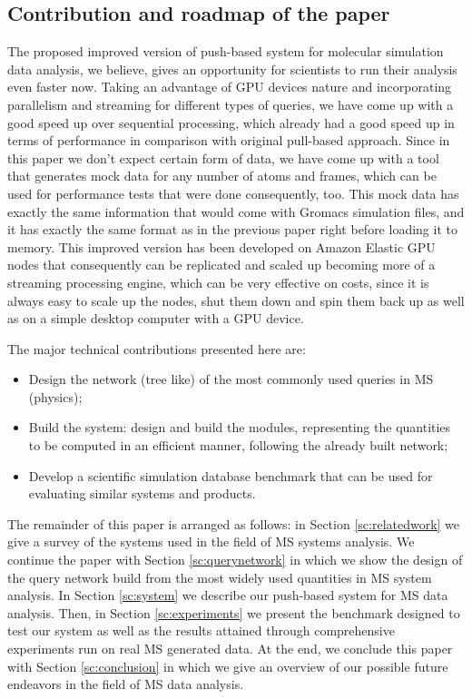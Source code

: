 \documentclass[10pt,journal,final,letterpaper,twocolumn]{IEEEtran}
\begin{document}
\subsection{Contribution and roadmap of the paper} 
The proposed improved version of push-based system for molecular simulation data analysis, we believe, gives an opportunity for scientists to run their analysis even faster now. Taking an advantage of GPU devices nature and incorporating parallelism and streaming for different types of queries, we have come up with a good speed up over sequential processing, which already had a good speed up in terms of performance in comparison with original pull-based approach. Since in this paper we don't expect certain form of data, we have come up with a tool that generates mock data for any number of atoms and frames, which can be used for performance tests that were done consequently, too. This mock data has exactly the same information that would come with Gromacs simulation files, and it has exactly the same format as in the previous paper \cite{mainPaper} right before loading it to memory. This improved version has been developed on Amazon Elastic GPU nodes that consequently can be replicated and scaled up becoming more of a streaming processing engine, which can be very effective on costs, since it is always easy to scale up the nodes, shut them down and spin them back up as well as on a simple desktop computer with a GPU device.

The major technical contributions presented here are:
\begin{itemize}
\item Design the network (tree like) of the most commonly used queries in MS (physics);
\item Build the system: design and build the modules, representing the quantities to be
computed in an efficient manner, following the already built
network;
\item Develop a scientific simulation database benchmark that can be used for evaluating similar systems and products.
\end{itemize}

The remainder of this paper is arranged as follows: in Section
\ref{sc:relatedwork} we give a survey of the systems used in the
field of MS systems analysis. We continue the paper with Section
\ref{sc:querynetwork} in which we show the design of the query
network build from the most widely used quantities in MS system
analysis. In Section \ref{sc:system} we describe our push-based
system for MS data analysis. Then, in Section \ref{sc:experiments}
we present the benchmark designed to test our system as well as the
results attained through comprehensive experiments run on real MS
generated data. At the end, we conclude this paper with Section
\ref{sc:conclusion} in which we give an overview of our possible
future endeavors in the field of MS data analysis.
\end{document}

